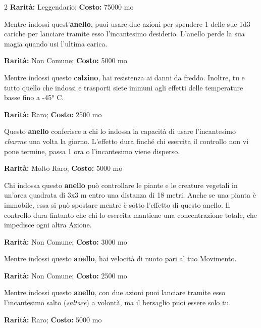 \begin{multicols}{2}
\textbf{Rarità:} Leggendario; \textbf{Costo:} 75000 mo

Mentre indossi quest'\textbf{anello}, puoi usare due azioni per spendere 1 delle sue 1d3 cariche per lanciare tramite esso l'incantesimo desiderio. L'anello perde la sua magia quando usi l'ultima carica.


\textbf{Rarità:} Non Comune; \textbf{Costo:} 5000 mo

Mentre indossi questo \textbf{calzino}, hai resistenza ai danni da freddo. Inoltre, tu e tutto quello che indossi e trasporti siete immuni agli effetti delle temperature basse fino a -45° C.


\textbf{Rarità:} Raro; \textbf{Costo:} 2500 mo

Questo \textbf{anello} conferisce a chi lo indossa la capacità di usare l'incantesimo \emph{charme} una volta la giorno. L'effetto dura finché chi esercita il controllo non vi pone termine, passa 1 ora o l'incantesimo viene disperso.


\textbf{Rarità:} Molto Raro; \textbf{Costo:} 5000 mo

Chi indossa questo \textbf{anello} può controllare le piante e le creature vegetali in un'area quadrata di 3x3 m entro una distanza di 18 metri. Anche se una pianta è immobile, essa si può spostare mentre è sotto l'effetto di questo anello. Il controllo dura fintanto che chi lo esercita mantiene una concentrazione totale, che impedisce ogni altra Azione.


\textbf{Rarità:} Non Comune; \textbf{Costo:} 3000 mo

Mentre indossi questo \textbf{anello}, hai velocità di nuoto pari al tuo Movimento.


\textbf{Rarità:} Non Comune; \textbf{Costo:} 2500 mo

Mentre indossi questo \textbf{anello}, con due azioni puoi lanciare tramite esso l'incantesimo salto (\emph{saltare}) a volontà, ma il bersaglio puoi essere solo tu.


\textbf{Rarità:} Raro; \textbf{Costo:} 5000 mo


\end{multicols}
